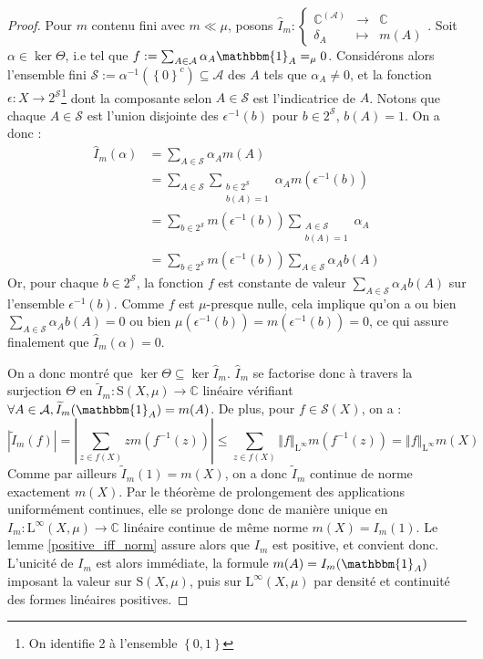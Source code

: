 \documentclass[a4paper,12pt]{article}
\newcommand{\C}{\mathbb{C}}
\newcommand{\norm}[1]{\left\Vert #1\right\Vert}
\newcommand{\abs}[1]{\left\vert#1\right\vert}
\newcommand{\set}[1]{\left\{ #1 \right\}}
\newcommand{\indic}{\mathbbm{1}}
\newcommand\fundef[3]{#1: \left\{\begin{array}{ccc}#2\\#3\end{array}\right.}
\newcommand{\inv}{^{-1}}
\newcommand{\compl}{^c}
\begin{document}
\begin{proof}
    Pour $m$ contenu fini avec $m\ll\mu$, posons $\fundef{\widehat{I}_m}{\C^{(\mathcal{A})}&\to&\C}{\delta_A&\mapsto&m(A)}$.
    Soit $\alpha\in\ker\Theta$, i.e tel que $f := \sum_{A\in\mathcal{A}} \alpha_A\indic_A =_\mu 0$. Considérons alors l'ensemble 
    fini $\mathcal{S}:=\alpha\inv\left(\set{0}\compl\right)\subseteq\mathcal{A}$ des $A$ tels que $\alpha_A\ne 0$, et la fonction 
    $\epsilon:X\to 2^\mathcal{S}$\footnote{On identifie 2 à l'ensemble $\set{0, 1}$} dont la composante selon $A\in\mathcal{S}$
    est l'indicatrice de $A$. Notons que chaque $A\in\mathcal{S}$ est l'union disjointe des $\epsilon\inv(b)$ pour $b\in2^\mathcal{S}$, $b(A) = 1$.
    On a donc :
    \begin{align*}
        \widehat{I}_m(\alpha) 
            &= \sum_{A\in\mathcal{S}} \alpha_A m(A) \\
            &= \sum_{A\in\mathcal{S}} \sum_{\substack{b\in2^\mathcal{S} \\ b(A) = 1}} \alpha_A m(\epsilon\inv(b)) \\
            &= \sum_{b\in2^\mathcal{S}} m(\epsilon\inv(b)) \sum_{\substack{A\in\mathcal{S} \\ b(A) = 1}} \alpha_A \\
            &= \sum_{b\in2^\mathcal{S}} m(\epsilon\inv(b)) \sum_{A\in\mathcal{S}} \alpha_A b(A)
    \end{align*}
    Or, pour chaque $b\in2^\mathcal{S}$, la fonction $f$ est constante de valeur $\sum_{A\in\mathcal{S}} \alpha_A b(A)$ sur l'ensemble 
    $\epsilon\inv(b)$. Comme $f$ est $\mu$-presque nulle, cela implique qu'on a ou bien $\sum_{A\in\mathcal{S}} \alpha_A b(A)=0$ ou bien $\mu(\epsilon\inv(b)) = m(\epsilon\inv(b)) = 0$,
    ce qui assure finalement que $\widehat{I}_m(\alpha) = 0$.

    On a donc montré que $\ker\Theta\subseteq\ker\widehat{I}_m$. $\widehat{I}_m$ se factorise donc à travers la surjection $\Theta$ en
    $\widetilde{I}_m:\mathrm{S}(X, \mu)\to\C$ linéaire vérifiant $\forall A\in\mathcal{A}, \widetilde{I}_m(\indic_A) = m(A)$. De plus, pour 
    $f\in\mathscr{S}(X)$, on a :
    \begin{equation*}
        \abs{\widetilde{I}_m(f)} = \abs{\sum_{z\in f(X)} zm(f\inv(z))} \le \sum_{z\in f(X)} \norm{f}_{\mathrm{L}^\infty} m(f\inv(z)) = \norm{f}_{\mathrm{L}^\infty} m(X)
    \end{equation*}
    Comme par ailleurs $\widetilde{I}_m(1)=m(X)$, on a donc $\widetilde{I}_m$ continue de norme exactement $m(X)$.
    Par le théorème de prolongement des applications uniformément continues, elle se prolonge donc de manière unique en $I_m : \mathrm{L}^\infty(X, \mu)\to\C$
    linéaire continue de même norme $m(X) = I_m(1)$. Le lemme \ref{positive_iff_norm} assure alors que $I_m$ est positive, et convient donc. 
    L'unicité de $I_m$ est alors 
    immédiate, la formule $m(A) = I_m(\indic_A)$ imposant la valeur sur $\mathrm{S}(X, \mu)$, puis sur $\mathrm{L}^\infty(X, \mu)$ par densité et continuité des formes linéaires 
    positives.


\end{proof}
\end{document}
